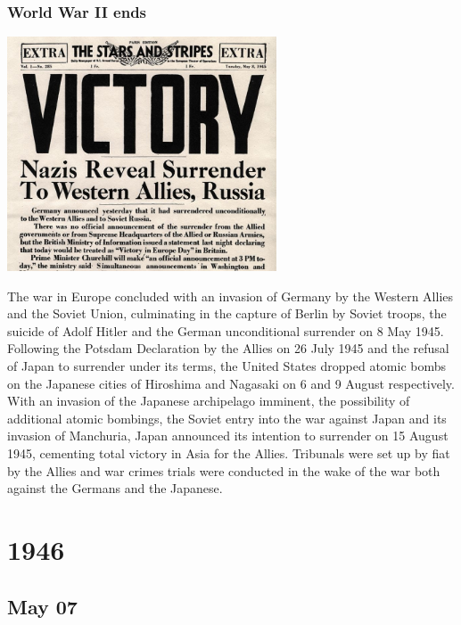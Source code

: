 \documentclass[11pt]{report}
\begin{document}
\subsection{World War II ends}
\vspace{2mm}\begin{center}\includegraphics[width=8cm]{./img/endww2.jpg}\end{center}
The war in Europe concluded with an invasion of Germany by the Western Allies and the Soviet Union, culminating in the capture of Berlin by Soviet troops, the suicide of Adolf Hitler and the German unconditional surrender on 8 May 1945. Following the Potsdam Declaration by the Allies on 26 July 1945 and the refusal of Japan to surrender under its terms, the United States dropped atomic bombs on the Japanese cities of Hiroshima and Nagasaki on 6 and 9 August respectively. With an invasion of the Japanese archipelago imminent, the possibility of additional atomic bombings, the Soviet entry into the war against Japan and its invasion of Manchuria, Japan announced its intention to surrender on 15 August 1945, cementing total victory in Asia for the Allies. Tribunals were set up by fiat by the Allies and war crimes trials were conducted in the wake of the war both against the Germans and the Japanese.

\chapter{1946}
\section{May 07}
\end{document}
